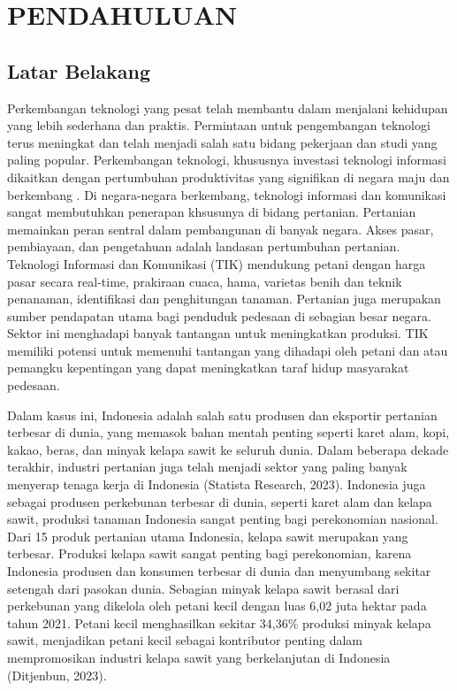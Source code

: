 \chapter{PENDAHULUAN}
\titlespacing*{\chapter}{0pt}{0pt}{0pt}
\section{Latar Belakang}
\label{sec:1-LatarBelakang}

\hspace{1,2cm}Perkembangan teknologi yang pesat telah membantu dalam menjalani kehidupan yang lebih sederhana dan praktis. Permintaan untuk pengembangan teknologi terus meningkat dan telah menjadi salah satu bidang pekerjaan dan studi yang paling popular\citep{UnderstandingTheRoleOfDigital2022}. Perkembangan teknologi, khususnya investasi teknologi informasi dikaitkan dengan pertumbuhan produktivitas yang signifikan di negara maju dan berkembang \citep{InformationTechnologyAndProductivity2014}. Di negara-negara berkembang, teknologi informasi dan komunikasi sangat membutuhkan penerapan khsusunya di bidang pertanian. Pertanian memainkan peran sentral dalam pembangunan di banyak negara. Akses pasar, pembiayaan, dan pengetahuan adalah landasan pertumbuhan pertanian. Teknologi Informasi dan Komunikasi (TIK) mendukung petani dengan harga pasar secara real-time, prakiraan cuaca, hama, varietas benih dan teknik penanaman, identifikasi dan penghitungan tanaman. Pertanian juga merupakan sumber pendapatan utama bagi penduduk pedesaan di sebagian besar negara. Sektor ini menghadapi banyak tantangan untuk meningkatkan produksi. TIK memiliki potensi untuk memenuhi tantangan yang dihadapi oleh petani dan atau pemangku kepentingan yang dapat meningkatkan taraf hidup masyarakat pedesaan\citep{TheRoleandPotential2020}.

Dalam kasus ini, Indonesia adalah salah satu produsen dan eksportir pertanian terbesar di dunia, yang memasok bahan mentah penting seperti karet alam, kopi, kakao, beras, dan minyak kelapa sawit ke seluruh dunia. Dalam beberapa dekade terakhir, industri pertanian juga telah menjadi sektor yang paling banyak menyerap tenaga kerja di Indonesia (Statista Research, 2023). Indonesia juga sebagai produsen perkebunan terbesar di dunia, seperti karet alam dan kelapa sawit, produksi tanaman Indonesia sangat penting bagi perekonomian nasional. Dari 15 produk pertanian utama Indonesia, kelapa sawit merupakan yang terbesar. Produksi kelapa sawit sangat penting bagi perekonomian, karena Indonesia produsen dan konsumen terbesar di dunia dan menyumbang sekitar setengah dari pasokan dunia. Sebagian minyak kelapa sawit berasal dari perkebunan yang dikelola oleh petani kecil dengan luas 6,02 juta hektar pada tahun 2021. Petani kecil menghasilkan sekitar 34,36\% produksi minyak kelapa sawit, menjadikan petani kecil sebagai kontributor penting dalam mempromosikan industri kelapa sawit yang berkelanjutan di Indonesia (Ditjenbun, 2023).

